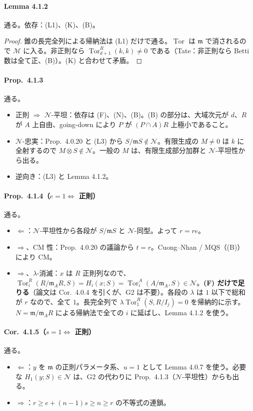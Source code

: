 \documentclass[11pt,a4paper]{ltjsarticle}
\theoremstyle{plain}
\theoremstyle{definition}
\theoremstyle{remark}
\theoremstyle{plain}
\newcommand{\m}{\mathfrak{m}}
\newcommand{\Tor}{\operatorname{Tor}}
\begin{document}
\paragraph{Lemma 4.1.2} 通る。依存：(L1)、(K)、(B)。
\begin{proof}
錐の長完全列による帰納法は (L1) だけで通る。$\Tor$ は $\m$ で消されるので $\mathcal{M}$ に入る。非正則なら $\Tor^R_{d+1}(k,k)\neq0$ である（Tate：非正則なら Betti 数は全て正、(B)）。(K) と合わせて矛盾。
\end{proof}

\paragraph{Prop.~4.1.3} 通る。
\begin{itemize}
  \item 正則 $\Rightarrow$ $\mathcal{N}$-平坦：依存は (F)、(N)、(B)。(B) の部分は、大域次元が $d$、$R$ が $A$ 上自由、going-down により $P$ が $(P\cap A)R$ 上極小であること。
  \item $\mathcal{N}$-忠実：Prop.~4.0.20 と (L3) から $S/\m S\notin\mathcal{N}$。有限生成の $M\ne0$ は $k$ に全射するので $M\otimes S\notin\mathcal{N}$。一般の $M$ は、有限生成部分加群と $\mathcal{N}$-平坦性から出る。
  \item 逆向き：(L3) と Lemma 4.1.2。
\end{itemize}

\paragraph{Prop.~4.1.4（$e = 1\Leftrightarrow$ 正則）} 通る。
\begin{itemize}
  \item $\Leftarrow$：$\mathcal{N}$-平坦性から各段が $S/\m S$ と $\mathcal{N}$-同型。よって $r = re$。
  \item $\Rightarrow$、CM 性：Prop.~4.0.20 の議論から $t = r$。Cuong--Nhan / MQS（(B)）により CM。
  \item $\Rightarrow$、$\lambda$-消滅：$x$ は $R$ 正則列なので、$\Tor^R_i(R/\m_AR,S) = H_i(x;S) = \Tor^A_i(A/\m_A,S)\in\mathcal{N}$。\textbf{(F) だけで足りる}（論文は Cor.~4.0.4 を引くが、G2 は不要）。各段の $\lambda$ は $1$ 以下で総和が $r$ なので、全て $1$。長完全列で $\lambda\Tor_1^R(S,R/I_j) = 0$ を帰納的に示す。$N = \m/\m_AR$ による帰納法で全ての $i$ に延ばし、Lemma 4.1.2 を使う。
\end{itemize}

\paragraph{Cor.~4.1.5（$s = 1\Leftrightarrow$ 正則）} 通る。
\begin{itemize}
  \item $\Leftarrow$：$y$ を $\m$ の正則パラメータ系、$u = 1$ として Lemma 4.0.7 を使う。必要な $H_1(y;S)\in\mathcal{N}$ は、G2 の代わりに Prop.~4.1.3（$\mathcal{N}$-平坦性）からも出る。
  \item $\Rightarrow$：$r\ge e+(n-1)s\ge n\ge r$ の不等式の連鎖。
\end{itemize}
\end{document}

